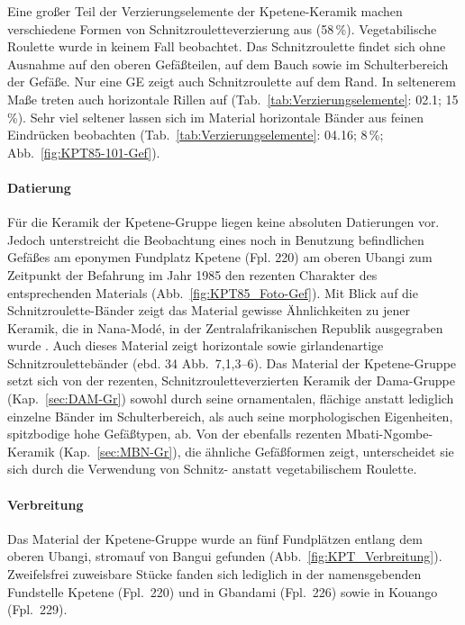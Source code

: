 Eine großer Teil der Verzierungselemente der Kpetene-Keramik machen verschiedene Formen von Schnitzrouletteverzierung aus (58\,\%). Vegetabilische Roulette wurde in keinem Fall beobachtet. Das Schnitzroulette findet sich ohne Ausnahme auf den oberen Gefäßteilen, auf dem Bauch sowie im Schulterbereich der Gefäße. Nur eine GE zeigt auch Schnitzroulette auf dem Rand. In seltenerem Maße treten auch horizontale Rillen auf (Tab.~\ref{tab:Verzierungselemente}: 02.1; 15\,\%). Sehr viel seltener lassen sich im Material horizontale Bänder aus feinen Eindrücken beobachten (Tab.~\ref{tab:Verzierungselemente}: 04.16; 8\,\%; Abb.~\ref{fig:KPT85-101-Gef}).

\paragraph{Datierung}
$\;$ \\
Für die Keramik der Kpetene-Gruppe liegen keine absoluten Datierungen vor. Jedoch unterstreicht die Beobachtung eines noch in Benutzung befindlichen Gefäßes am eponymen Fundplatz Kpetene (Fpl. 220) am oberen Ubangi zum Zeitpunkt der Befahrung im Jahr 1985 den rezenten Charakter des entsprechenden Materials (Abb.~\ref{fig:KPT85_Foto-Gef}). Mit Blick auf die Schnitzroulette-Bänder zeigt das Material gewisse Ähnlichkeiten zu jener Keramik, die in Nana-Modé, in der Zentralafrikanischen Republik ausgegraben wurde \parencite{David.1977}. Auch dieses Material zeigt horizontale sowie girlandenartige Schnitzroulettebänder (ebd. 34 Abb.~7,1,3--6). Das Material der Kpetene-Gruppe setzt sich von der rezenten, Schnitzrouletteverzierten Keramik der Dama-Gruppe (Kap.~\ref{sec:DAM-Gr}) sowohl durch seine ornamentalen, flächige anstatt lediglich einzelne Bänder im Schulterbereich, als auch seine morphologischen Eigenheiten, spitzbodige hohe  Gefäßtypen, ab. Von der ebenfalls rezenten Mbati-Ngombe-Keramik (Kap.~\ref{sec:MBN-Gr}), die ähnliche Gefäßformen zeigt, unterscheidet sie sich durch die Verwendung von Schnitz- anstatt vegetabilischem Roulette.

\paragraph{Verbreitung}
$\;$ \\
Das Material der Kpetene-Gruppe wurde an fünf Fundplätzen entlang dem oberen Ubangi, stromauf von Bangui gefunden (Abb.~\ref{fig:KPT_Verbreitung}). Zweifelsfrei zuweisbare Stücke fanden sich lediglich in der namensgebenden Fundstelle Kpetene (Fpl.~220) und in Gbandami (Fpl.~226) sowie in Kouango (Fpl.~229). 